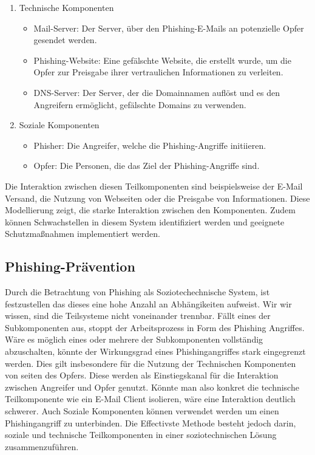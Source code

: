 \documentclass[journal=tosc,final]{iacrtrans}
\begin{document}
\begin{enumerate}
\item Technische Komponenten
\begin{itemize}
\item Mail-Server: Der Server, über den Phishing-E-Mails an potenzielle Opfer gesendet werden.
\item Phishing-Website: Eine gefälschte Website, die erstellt wurde, um die Opfer zur Preisgabe ihrer vertraulichen Informationen zu verleiten.
\item DNS-Server: Der Server, der die Domainnamen auflöst und es den Angreifern ermöglicht, gefälschte Domains zu verwenden.
\end{itemize}
\item Soziale Komponenten
\begin{itemize}
\item Phisher: Die Angreifer, welche die Phishing-Angriffe initiieren.
\item Opfer: Die Personen, die das Ziel der Phishing-Angriffe sind.
\end{itemize}
\end{enumerate}
Die Interaktion zwischen diesen Teilkomponenten sind beispielsweise der E-Mail Versand, die Nutzung von Webseiten oder die Preisgabe von Informationen. Diese Modellierung zeigt, die starke Interaktion zwischen den Komponenten. Zudem können Schwachstellen in diesem System identifiziert werden und geeignete Schutzmaßnahmen implementiert werden.
\subsection{Phishing-Prävention}
Durch die Betrachtung von Phishing als Soziotechechnische System, ist festzustellen das dieses eine hohe Anzahl an Abhängikeiten aufweist. Wir wir wissen, sind die Teilsysteme nicht voneinander trennbar. Fällt eines der Subkomponenten aus, stoppt der Arbeitsprozess in Form des Phishing Angriffes. Wäre es möglich eines oder mehrere der Subkomponenten vollständig  abzuschalten, könnte der Wirkungsgrad eines Phishingangriffes stark eingegrenzt werden. Dies gilt insbesondere für die Nutzung der Technischen Komponenten von seiten des Opfers. Diese werden als Einstiegskanal für die Interaktion zwischen Angreifer und Opfer genutzt. Könnte man also konkret die technische Teilkomponente wie ein E-Mail Client isolieren, wäre eine Interaktion deutlich schwerer. Auch Soziale Komponenten können verwendet  werden um einen Phishingangriff zu unterbinden. Die Effectivste Methode besteht jedoch darin, soziale und technische Teilkomponenten in einer soziotechnischen Lösung zusammenzuführen.
\end{document}
